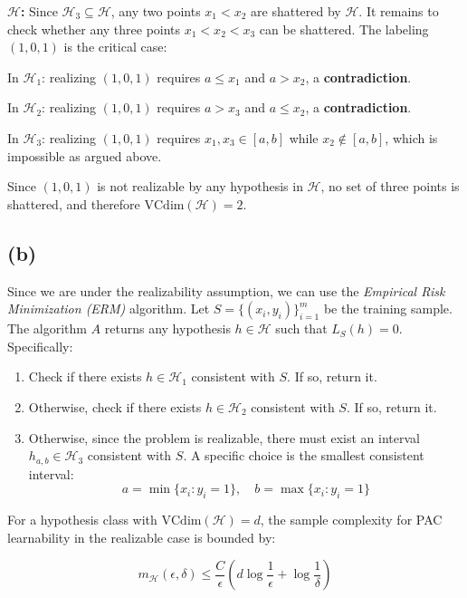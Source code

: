 \documentclass[12pt]{article}
\begin{document}
\noindent\textbf{$\mathcal{H}$:} Since $\mathcal{H}_3 \subseteq \mathcal{H}$, any two points $x_1 < x_2$ are shattered by $\mathcal{H}$. It remains to check whether any three points $x_1 < x_2 < x_3$ can be shattered. The labeling $(1,0,1)$ is the critical case:

\noindent In $\mathcal{H}_1$: realizing $(1,0,1)$ requires $a \leq x_1$ and $a > x_2$, a \textbf{contradiction}. 

\noindent In $\mathcal{H}_2$: realizing $(1,0,1)$ requires $a > x_3$ and $a \leq x_2$, a \textbf{contradiction}. 

\noindent In $\mathcal{H}_3$: realizing $(1,0,1)$ requires $x_1, x_3 \in [a,b]$ while $x_2 \notin [a,b]$, which is impossible as argued above.

\noindent Since $(1,0,1)$ is not realizable by any hypothesis in $\mathcal{H}$, no set of three points is shattered, and therefore $\mathrm{VCdim}(\mathcal{H}) = 2$.

\subsection*{(b)}

Since we are under the realizability assumption, we can use the \textit{Empirical Risk Minimization (ERM)} algorithm. Let $S = \{(x_i, y_i)\}_{i=1}^m$ be the training sample. The algorithm $A$ returns any hypothesis $h \in \mathcal{H}$ such that $L_S(h) = 0$. Specifically:

\begin{enumerate}
    \item Check if there exists $h \in \mathcal{H}_1$ consistent with $S$. If so, return it.
    \item Otherwise, check if there exists $h \in \mathcal{H}_2$ consistent with $S$. If so, return it.
    \item Otherwise, since the problem is realizable, there must exist an interval $h_{a,b} \in \mathcal{H}_3$ consistent with $S$. A specific choice is the smallest consistent interval:
    $$ a = \min \{x_i : y_i = 1\}, \quad b = \max \{x_i : y_i = 1\} $$
\end{enumerate}

\noindent For a hypothesis class with $\mathrm{VCdim}(\mathcal{H}) = d$, the sample complexity for PAC learnability in the realizable case is bounded by:

$$ m_{\mathcal{H}}(\epsilon, \delta) \leq \frac{C}{\epsilon} \left( d \log \frac{1}{\epsilon} + \log \frac{1}{\delta} \right) $$
\end{document}
